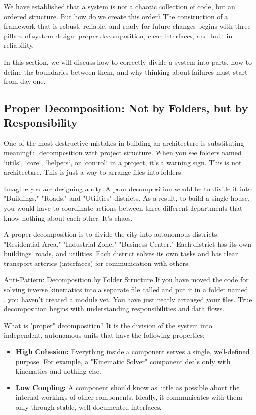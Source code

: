 We have established that a system is not a chaotic collection of code, but an ordered structure. But how do we create this order? The construction of a framework that is robust, reliable, and ready for future changes begins with three pillars of system design: proper decomposition, clear interfaces, and built-in reliability.

In this section, we will discuss how to correctly divide a system into parts, how to define the boundaries between them, and why thinking about failures must start from day one.

\subsection{Proper Decomposition: Not by Folders, but by Responsibility}

One of the most destructive mistakes in building an architecture is substituting meaningful decomposition with project structure. When you see folders named `utils`, `core`, `helpers`, or `control` in a project, it's a warning sign. This is not architecture. This is just a way to arrange files into folders.

Imagine you are designing a city. A poor decomposition would be to divide it into "Buildings," "Roads," and "Utilities" districts. As a result, to build a single house, you would have to coordinate actions between three different departments that know nothing about each other. It's chaos.

A proper decomposition is to divide the city into autonomous districts: "Residential Area," "Industrial Zone," "Business Center." Each district has its own buildings, roads, and utilities. Each district solves its own tasks and has clear transport arteries (interfaces) for communication with others.

\begin{dangerbox}{Anti-Pattern: Decomposition by Folder Structure}
If you have moved the code for solving inverse kinematics into a separate file called  and put it in a folder named , you haven't created a module yet. You have just neatly arranged your files. True decomposition begins with understanding responsibilities and data flows.
\end{dangerbox}

What is "proper" decomposition? It is the division of the system into independent, autonomous units that have the following properties:

\begin{itemize}
    \item \textbf{High Cohesion:} Everything inside a component serves a single, well-defined purpose. For example, a "Kinematic Solver" component deals only with kinematics and nothing else.
    \item \textbf{Low Coupling:} A component should know as little as possible about the internal workings of other components. Ideally, it communicates with them only through stable, well-documented interfaces.
\end{itemize}



